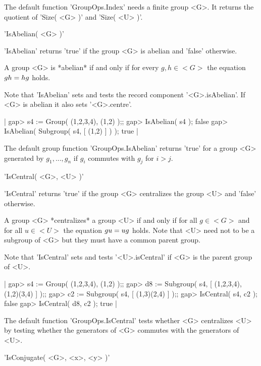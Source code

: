 The  default  function  'GroupOps.Index' needs   a finite  group <G>.  It
returns the quotient of 'Size( <G> )' and 'Size( <U> )'.


'IsAbelian( <G> )'

'IsAbelian'  returns 'true' if  the  group   <G> is   abelian and 'false'
otherwise.

A  group  <G>  is *abelian* if  and only if  for every  $g, h\in <G>$ the
equation $g\* h = h\* g$ holds.

Note   that  'IsAbelian'  sets    and   tests    the   record   component
'<G>.isAbelian'.  If <G> is abelian it also  sets '<G>.centre'.

|    gap> s4 := Group( (1,2,3,4), (1,2) );;
    gap> IsAbelian( s4 );
    false
    gap> IsAbelian( Subgroup( s4, [ (1,2) ] ) );
    true |

The default  group   function 'GroupOps.IsAbelian' returns 'true' for   a
group <G> generated by $g_1,  ..., g_n$ if $g_i$  commutes with $g_j$ for
$i > j$.


'IsCentral( <G>, <U> )'

'IsCentral' returns 'true' if the group <G> centralizes the group <U> and
'false' otherwise.

A group <G>  *centralizes*  a group <U> if and only if for all $g\in <G>$
and for all $u\in <U>$ the equation $g\* u = u\* g$ holds.  Note that <U>
need not  to  be a subgroup  of  <G> but they  must have a  common parent
group.

Note that 'IsCentral' sets and tests '<U>.isCentral' if <G> is the parent
group of <U>.

|    gap> s4 := Group( (1,2,3,4), (1,2) );;
    gap> d8 := Subgroup( s4, [ (1,2,3,4), (1,2)(3,4) ] );;
    gap> c2 := Subgroup( s4, [ (1,3)(2,4) ] );;
    gap> IsCentral( s4, c2 );
    false
    gap> IsCentral( d8, c2 );
    true |

The  default function 'GroupOps.IsCentral'  tests whether <G> centralizes
<U> by testing whether the generators of <G> commutes with the generators
of <U>.


'IsConjugate( <G>, <x>, <y> )'


